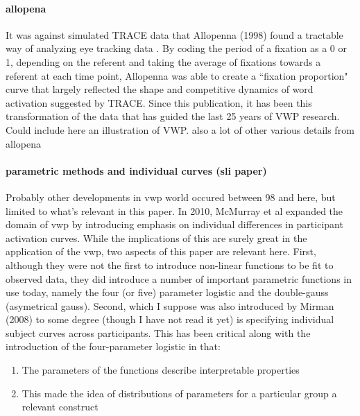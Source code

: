 \documentclass{article}
\begin{document}
\paragraph{allopena} It was against simulated TRACE data that Allopenna (1998) found a tractable way of analyzing eye tracking data \cite{allopenna1998tracking}. By coding the period of a fixation as a 0 or 1, depending on the referent and taking the average of fixations towards a referent at each time point, Allopenna was able to create a ``fixation proportion" curve that largely reflected the shape and competitive dynamics of word activation suggested by TRACE. Since this publication, it has been this transformation of the data that has guided the last 25 years of VWP research. Could include here an illustration of VWP. also a lot of other various details from allopena



\paragraph{parametric methods and individual curves (sli paper)} Probably other developments in vwp world occured between 98 and here, but limited to what's relevant in this paper. In 2010, McMurray et al expanded the domain of vwp by introducing emphasis on individual differences in participant activation curves. While the implications of this are surely great in the application of the vwp, two aspects of this paper are relevant here. First, although they were not the first to introduce non-linear functions to be fit to observed data, they did introduce a number of important parametric functions in use today, namely the four (or five) parameter logistic and the double-gauss (asymetrical gauss). Second, which I suppose was also introduced by Mirman (2008) to some degree (though I have not read it yet) is specifying individual subject curves across participants. This has been critical along with the introduction of the four-parameter logistic in that:

\begin{singlespace}
\begin{enumerate}
\vspace{-3mm}
\item The parameters of the functions describe interpretable properties
\item This made the idea of distributions of parameters for a particular group a relevant construct
\end{enumerate}
\end{singlespace}
\end{document}
